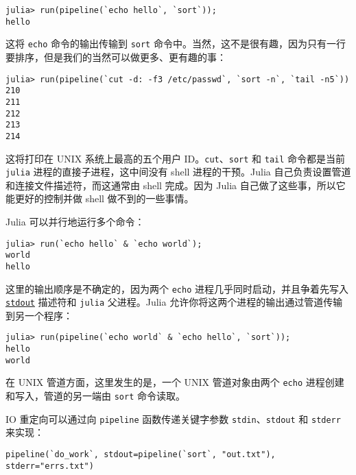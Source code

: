 \begin{verbatim}
julia> run(pipeline(`echo hello`, `sort`));
hello
\end{verbatim}



这将 \texttt{echo} 命令的输出传输到 \texttt{sort} 命令中。当然，这不是很有趣，因为只有一行要排序，但是我们的当然可以做更多、更有趣的事：




\begin{verbatim}
julia> run(pipeline(`cut -d: -f3 /etc/passwd`, `sort -n`, `tail -n5`))
210
211
212
213
214
\end{verbatim}



这将打印在 UNIX 系统上最高的五个用户 ID。\texttt{cut}、\texttt{sort} 和 \texttt{tail} 命令都是当前 \texttt{julia} 进程的直接子进程，这中间没有 shell 进程的干预。Julia 自己负责设置管道和连接文件描述符，而这通常由 shell 完成。因为 Julia 自己做了这些事，所以它能更好的控制并做 shell 做不到的一些事情。



Julia 可以并行地运行多个命令：




\begin{verbatim}
julia> run(`echo hello` & `echo world`);
world
hello
\end{verbatim}



这里的输出顺序是不确定的，因为两个 \texttt{echo} 进程几乎同时启动，并且争着先写入 \hyperlink{18181294266083891471}{\texttt{stdout}} 描述符和 \texttt{julia} 父进程。Julia 允许你将这两个进程的输出通过管道传输到另一个程序：




\begin{verbatim}
julia> run(pipeline(`echo world` & `echo hello`, `sort`));
hello
world
\end{verbatim}



在 UNIX 管道方面，这里发生的是，一个 UNIX 管道对象由两个 \texttt{echo} 进程创建和写入，管道的另一端由 \texttt{sort} 命令读取。



IO 重定向可以通过向 \texttt{pipeline} 函数传递关键字参数 \texttt{stdin}、\texttt{stdout} 和 \texttt{stderr} 来实现：




\begin{verbatim}
pipeline(`do_work`, stdout=pipeline(`sort`, "out.txt"), stderr="errs.txt")
\end{verbatim}




